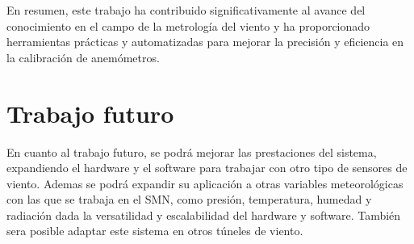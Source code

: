 En resumen, este trabajo ha contribuido significativamente al avance del conocimiento en el campo de la metrología del viento y ha proporcionado herramientas prácticas y automatizadas para mejorar la precisión y eficiencia en la calibración de anemómetros.

\section{Trabajo futuro}

En cuanto al trabajo futuro, se podrá mejorar las prestaciones del sistema, expandiendo el hardware y el software para trabajar con otro tipo de sensores de viento. Ademas se podrá expandir su aplicación a otras variables meteorológicas con las que se trabaja en el SMN, como presión, temperatura, humedad y radiación dada la versatilidad y escalabilidad del hardware y software. También sera posible adaptar este sistema en otros túneles de viento.



